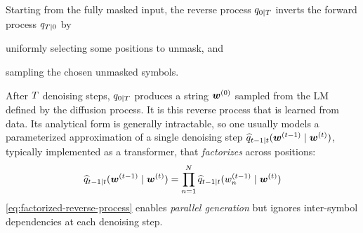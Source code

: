 \documentclass{article} %
\begin{document}
Starting from the fully masked input, the reverse process ${q}_{0|{T}}$ inverts the forward process ${q}_{{T}|0}$ by 
\begin{enumerate*}[label=(\arabic*)]
   \item uniformly selecting some positions to unmask, and
   \item sampling the chosen unmasked symbols.
\end{enumerate*}
After ${T}$ denoising steps, ${q}_{0|{T}}$ produces a string ${{\boldsymbol{w}}}^{(0)}$ sampled from the LM defined by the diffusion process.
It is this reverse process that is learned from data.
Its analytical form is generally intractable, so one usually models a parameterized approximation of a single denoising step ${\widehat{q}}_{t - 1|t}({{\boldsymbol{w}}}^{(t-1)} \mid {{\boldsymbol{w}}}^{(t)})$, typically implemented as a transformer, that \emph{factorizes} across positions:
\begin{equation} \label{eq:factorized-reverse-process}
   {\widehat{q}}_{t - 1|t}({{\boldsymbol{w}}}^{(t-1)} \mid {{\boldsymbol{w}}}^{(t)}) = \prod_{{{n}}=1}^{{N}} {\widehat{q}}_{t - 1|t}({{w}}^{(t-1)}_{{n}} \mid {{\boldsymbol{w}}}^{(t)})
\end{equation}
\cref{eq:factorized-reverse-process} enables \emph{parallel generation} but ignores inter-symbol dependencies at each denoising step.
\end{document}
